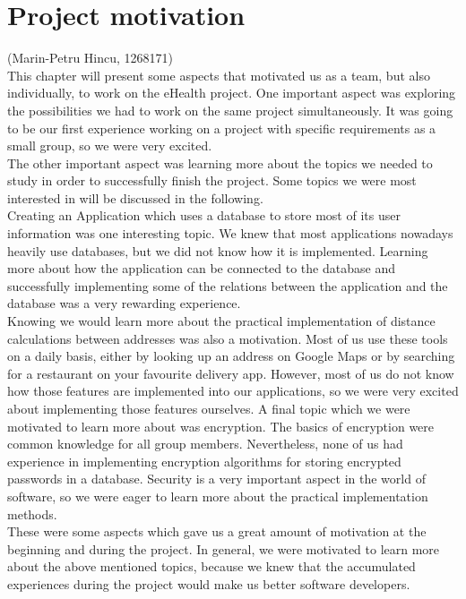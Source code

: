 \documentclass[a4paper, 12pt]{report}
\begin{document}
{\let\clearpage\relax \chapter{Project motivation}}
{\tiny (Marin-Petru Hincu, 1268171)\\}
This chapter will present some aspects that motivated us as a team, but also individually, to work on the eHealth project.
One important aspect was exploring the possibilities we had to work on the same project simultaneously. It was going to be our first experience working on a project with specific requirements as a small group, so we were very excited. \\
The other important aspect was learning more about the topics we needed to study in order to successfully finish the project. Some topics we were most interested in will be discussed in the following.\\
Creating an Application which uses a database to store most of its user information was one interesting topic. We knew that most applications nowadays heavily use databases, but we did not know how it is implemented. Learning more about how the application can be connected to the database and successfully implementing some of the relations between the application and the database was a very rewarding experience. \\
Knowing we would learn more about the practical implementation of distance calculations between addresses was also a motivation. Most of us use these tools on a daily basis, either by looking up an address on Google Maps or by searching for a restaurant on your favourite delivery app. However, most of us do not know how those features are implemented into our applications, so we were very excited about implementing those features ourselves.
A final topic which we were motivated to learn more about was encryption. The basics of encryption were common knowledge for all group members. Nevertheless, none of us had experience in implementing encryption algorithms for storing encrypted passwords in a database. Security is a very important aspect in the world of software, so we were eager to learn more about the practical implementation methods. \\
These were some aspects which gave us a great amount of motivation at the beginning and during the project. In general, we were motivated to learn more about the above mentioned topics, because we knew that the accumulated experiences during the project would make us better software developers.
\\
\\
\\
\end{document}
